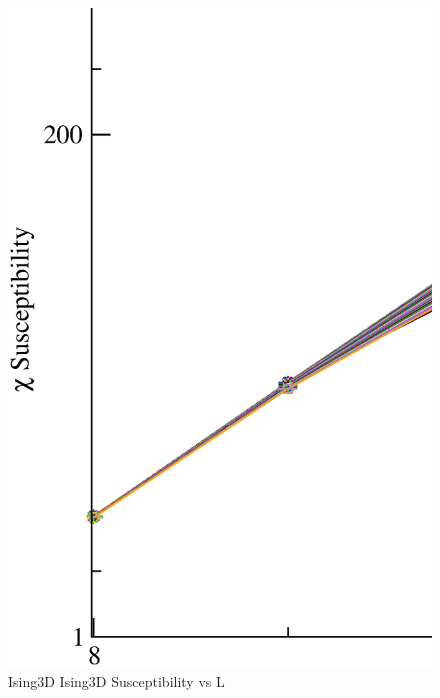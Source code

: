 \begin{figure}[!htpb]
  \centering
  \includegraphics[width=\textwidth]{./plots/Ising3D/Ising3D_Susceptibility_vs_L.eps}
  \caption{Ising3D Ising3D Susceptibility vs L}
\end{figure}

